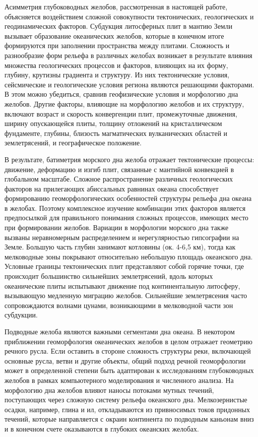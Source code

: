 Асимметрия глубоководных желобов, рассмотренная в настоящей работе, объясняется воздействием сложной совокупности тектонических, геологических и геодинамических факторов. Субдукция литосферных плит в мантию Земли вызывает образование океанических желобов, которые в конечном итоге формируются при заполнении пространства между плитами. Сложность и разнообразие форм рельефа в различных желобах возникает в результате влияния множества геологических процессов и факторов, влияющих на их форму, глубину, крутизны градиента и структуру. Из них тектонические условия, сейсмические и геологические условия региона являются решающими факторами. В этом можно убедиться, сравнив геофизические условия и морфологию дна желобов. Другие факторы, влияющие на морфологию желобов и их структуру, включают возраст и скорость конвергенции плит, промежуточные движения, ширину опускающейся плиты, толщину отложений на кристаллическом фундаменте, глубины, близость магматических вулканических областей и землетрясений, и географическое положение.

В результате, батиметрия морского дна желоба отражает тектонические процессы: движение, деформацию и изгиб плит, связанные с мантийной конвекцией в глобальном масштабе. Сложное распространение различных геологических факторов на прилегающих абиссальных равнинах океана способствует формированию геоморфологических особенностей структуры рельефа дна океана в желобах. Поэтому комплексное изучение комбинации этих факторов является предпосылкой для правильного понимания сложных процессов, имеющих место при формировании желобов. Вариации в морфологии морского дна также вызваны неравномерным распределением и нерегулярностью гипсографии на Земле. Большую часть глубин занимают котловины (ок. 4-6,5 км), тогда как мелководные зоны покрывают относительно небольшую площадь океанского дна. Условные границы тектонических плит представляют собой горячие точки, где происходит большинство сильнейших землетрясений, вдоль которых океанические плиты испытывают движение под континентальную литосферу, вызывающую медленную миграцию желобов. Сильнейшие землетрясения часто сопровождаются волнами цунами, возникающими в мелководной части зон субдукции.

Подводные желоба являются важными сегментами дна океана. В некотором приближении геоморфология океанических желобов в целом отражает геометрию речного русла. Если оставить в стороне сложность структуры реки, включающей основные русла, ветви и другие объекты, общий подход речной геоморфологии может в определенной степени быть адаптирован к исследованиям глубоководных желобов в рамках компьютерного моделирования и численного анализа. На морфологию дна желобов влияют наносы потоками мутных течений, поступающих через сложную систему рельефа океанского дна. Мелкозернистые осадки, например, глина и ил, откладываются из привносимых токов придонных течений, которые направляется с окраин континента по подводным каньонам вниз и в конечном счете оказываются в глубоких океанских желобах. 

